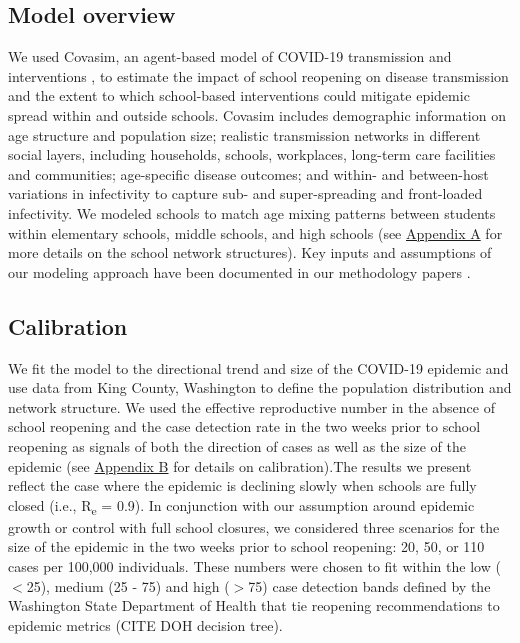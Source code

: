 \documentclass[preprint,12pt]{elsarticle}
\begin{document}
\subsection{Model overview}
We used Covasim, an agent-based model of COVID-19 transmission and interventions \cite{kerr_controlling_2020, kerr_covasim_2020}, to estimate the impact of school reopening on disease transmission and the extent to which school-based interventions could mitigate epidemic spread within and outside schools. Covasim includes demographic information on age structure and population size; realistic transmission networks in different social layers, including households, schools, workplaces, long-term care facilities and communities; age-specific disease outcomes; and within- and between-host variations in infectivity to capture sub- and super-spreading and front-loaded infectivity. We modeled schools to match age mixing patterns between students within elementary schools, middle schools, and high schools \cite{guclu_social_2016} (see \hyperref[sec:AppendixA]{Appendix A} for more details on the school network structures). Key inputs and assumptions of our modeling approach have been documented in our methodology papers \cite{kerr_controlling_2020, kerr_covasim_2020}.

\subsection{Calibration}

We fit the model to the directional trend and size of the COVID-19 epidemic and use data from King County, Washington to define the population distribution and network structure. We used the effective reproductive number in the absence of school reopening and the case detection rate in the two weeks prior to school reopening as signals of both the direction of cases as well as the size of the epidemic (see \hyperref[sec:AppendixB]{Appendix B} for details on calibration).The results we present reflect the case where the epidemic is declining slowly when schools are fully closed (i.e., R\textsubscript{e} = 0.9). In conjunction with our assumption around epidemic growth or control with full school closures, we considered three scenarios for the size of the epidemic in the two weeks prior to school reopening: 20, 50, or 110 cases per 100,000 individuals. These numbers were chosen to fit within the low ($<$25), medium (25 - 75) and high ($>$75) case detection bands defined by the Washington State Department of Health that tie reopening recommendations to epidemic metrics (CITE DOH decision tree). %
\end{document}
